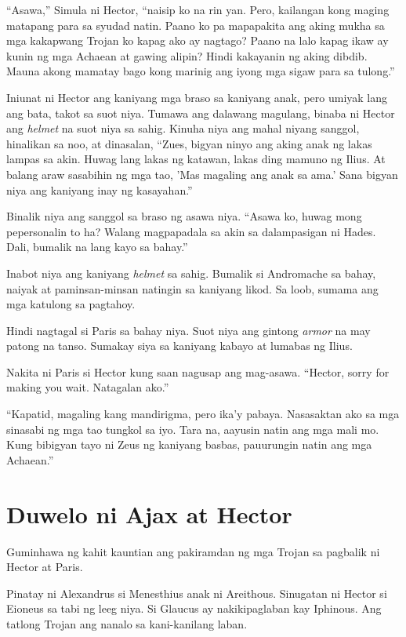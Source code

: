 \documentclass[12pt,letterpaper]{report}
\begin{document}
``Asawa,'' Simula ni Hector, ``naisip ko na rin yan. Pero, kailangan kong maging matapang para sa syudad natin. Paano ko pa mapapakita ang aking mukha sa mga kakapwang Trojan ko kapag ako ay nagtago? Paano na lalo kapag ikaw ay kunin ng mga Achaean at gawing alipin? Hindi kakayanin ng aking dibdib. Mauna akong mamatay bago kong marinig ang iyong mga sigaw para sa tulong.''

Iniunat ni Hector ang kaniyang mga braso sa kaniyang anak, pero umiyak lang ang bata, takot sa suot niya. Tumawa ang dalawang magulang, binaba ni Hector ang \textit{helmet} na suot niya sa sahig. Kinuha niya ang mahal niyang sanggol, hinalikan sa noo, at dinasalan, ``Zues, bigyan ninyo ang aking anak ng lakas lampas sa akin. Huwag lang lakas ng katawan, lakas ding mamuno ng Ilius. At balang araw sasabihin ng mga tao, 'Mas magaling ang anak sa ama.' Sana bigyan niya ang kaniyang inay ng kasayahan.''

Binalik niya ang sanggol sa braso ng asawa niya. ``Asawa ko, huwag mong pepersonalin to ha? Walang magpapadala sa akin sa dalampasigan ni Hades. Dali, bumalik na lang kayo sa bahay.''

Inabot niya ang kaniyang \textit{helmet} sa sahig. Bumalik si Andromache sa bahay, naiyak at paminsan-minsan natingin sa kaniyang likod. Sa loob, sumama ang mga katulong sa pagtahoy.

Hindi nagtagal si Paris sa bahay niya. Suot niya ang gintong \textit{armor} na may patong na tanso. Sumakay siya sa kaniyang kabayo at lumabas ng Ilius.

Nakita ni Paris si Hector kung saan nagusap ang mag-asawa. ``Hector, sorry for making you wait. Natagalan ako.''

``Kapatid, magaling kang mandirigma, pero ika'y pabaya. Nasasaktan ako sa mga sinasabi ng mga tao tungkol sa iyo. Tara na, aayusin natin ang mga mali mo. Kung bibigyan tayo ni Zeus ng kaniyang basbas, pauurungin natin ang mga Achaean.''

\pagebreak
\chapter{Duwelo ni Ajax at Hector}
Guminhawa ng kahit kauntian ang pakiramdan ng mga Trojan sa pagbalik ni Hector at Paris.

Pinatay ni Alexandrus si Menesthius anak ni Areithous. Sinugatan ni Hector si Eioneus sa tabi ng leeg niya. Si Glaucus ay nakikipaglaban kay Iphinous. Ang tatlong Trojan ang nanalo sa kani-kanilang laban.
\end{document}
